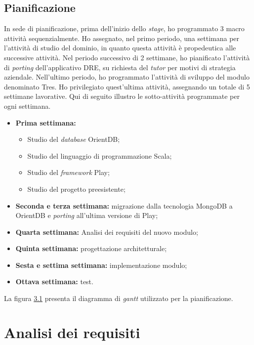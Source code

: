 \subsection{Pianificazione}
In sede di pianificazione, prima dell'inizio dello \emph{stage}, ho programmato 3 macro attività sequenzialmente. Ho assegnato, nel primo periodo, una settimana per l'attività di studio del dominio, in quanto questa attività è propedeutica alle successive attività. Nel periodo successivo di 2 settimane, ho pianificato l'attività di \emph{porting} dell'applicativo DRE, su richiesta del \emph{tutor} per motivi di strategia aziendale. Nell'ultimo periodo, ho programmato l'attività di sviluppo del modulo denominato Tres. Ho privilegiato quest'ultima attività, assegnando un totale di 5 settimane lavorative. Qui di seguito illustro le sotto-attività programmate per ogni settimana. 
\begin{itemize}
\item \textbf{Prima settimana:}
\begin{itemize}
\item Studio del \emph{database} OrientDB;
\item Studio del linguaggio di programmazione Scala;
\item Studio del \emph{framework} Play;
\item Studio del progetto preesistente;
\end{itemize}
\item \textbf{Seconda e terza settimana:} migrazione dalla tecnologia MongoDB a OrientDB e \emph{porting} all’ultima versione di Play;
\item \textbf{Quarta settimana:} Analisi dei requisiti del nuovo modulo;
\item \textbf{Quinta settimana:} progettazione architetturale;
\item \textbf{Sesta e settima settimana:} implementazione modulo;
\item \textbf{Ottava settimana:} test.
\end{itemize}
La figura \hyperref[fig:gantt]{3.1} presenta il diagramma di \emph{gantt} utilizzato per la pianificazione.




\section{Analisi dei requisiti} 
